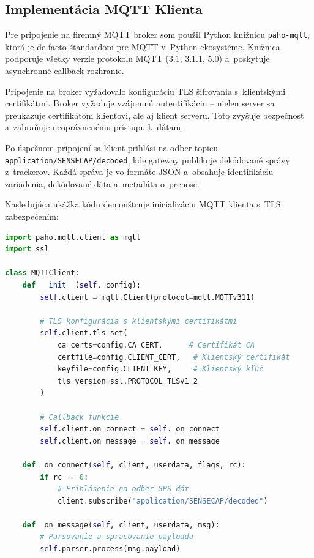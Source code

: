 \subsection{Implementácia MQTT Klienta}
\label{sec:BrokerPripojenie}

Pre pripojenie na firemný MQTT broker som použil Python knižnicu \texttt{paho-mqtt}, ktorá je de facto štandardom pre MQTT v~Python ekosystéme. Knižnica podporuje všetky verzie protokolu MQTT (3.1, 3.1.1, 5.0) a~poskytuje asynchronné callback rozhranie.

Pripojenie na broker vyžadovalo konfiguráciu TLS šifrovania s~klientskými certifikátmi. Broker vyžaduje vzájomnú autentifikáciu -- nielen server sa preukazuje certifikátom klientovi, ale aj klient serveru. Toto zvyšuje bezpečnosť a~zabraňuje neoprávnenému prístupu k~dátam.

Po úspešnom pripojení sa klient prihlási na odber topicu \texttt{application/SENSECAP/decoded}, kde gateway publikuje dekódované správy z~trackerov. Každá správa je vo formáte JSON a~obsahuje identifikáciu zariadenia, dekódované dáta a~metadáta o~prenose.

Nasledujúca ukážka kódu demonštruje inicializáciu MQTT klienta s~TLS zabezpečením:

\begin{lstlisting}[language=Python, label=src:mqtt-client, caption={Inicializácia MQTT klienta s~TLS autentifikáciou}]
import paho.mqtt.client as mqtt
import ssl

class MQTTClient:
    def __init__(self, config):
        self.client = mqtt.Client(protocol=mqtt.MQTTv311)

        # TLS konfigurácia s klientskými certifikátmi
        self.client.tls_set(
            ca_certs=config.CA_CERT,      # Certifikát CA
            certfile=config.CLIENT_CERT,   # Klientský certifikát
            keyfile=config.CLIENT_KEY,     # Klientský kľúč
            tls_version=ssl.PROTOCOL_TLSv1_2
        )

        # Callback funkcie
        self.client.on_connect = self._on_connect
        self.client.on_message = self._on_message

    def _on_connect(self, client, userdata, flags, rc):
        if rc == 0:
            # Prihlásenie na odber GPS dát
            client.subscribe("application/SENSECAP/decoded")

    def _on_message(self, client, userdata, msg):
        # Parsovanie a spracovanie payloadu
        self.parser.process(msg.payload)
\end{lstlisting}


